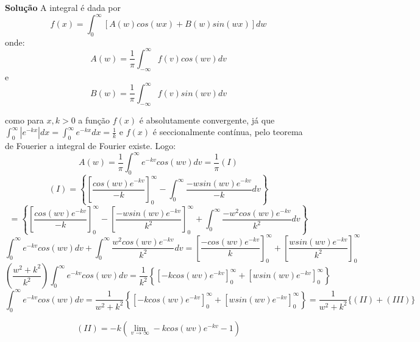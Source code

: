 \linespread{1.5}

\textbf{Solução}
A integral é dada por 
\begin{equation*}
    f(x) = \int_0^\infty [A(w)cos(wx) + B(w)sin(wx)]dw
\end{equation*}
onde:
\begin{equation*}
    A(w) = \frac{1}{\pi}\int_{-\infty}^\infty f(v) cos(wv)dv
\end{equation*}
e
\begin{equation*}
    B(w) = \frac{1}{\pi} \int_{-\infty}^\infty f(v) sin(wv)dv
\end{equation*}

como para $x, k> 0$ a função $f(x)$ é absolutamente convergente, já que $\int_0^\infty |e^{-kx}|dx = \int_0^\infty e^{-kx}dx = \frac{1}{k}$ e $f(x)$ é seccionalmente contínua, pelo teorema de Fouerier a integral de Fourier existe. Logo:
\begin{equation*}
    A(w) = \frac{1}{\pi}\int_0^\infty e^{-kv} cos(wv)dv = \frac{1}{\pi} (I)
\end{equation*}
\begin{equation*}
    (I) = \left\{\left[\frac{cos(wv)e^{-kv}}{-k}\right]^\infty_0 - \int_0^\infty \frac{-wsin(wv)e^{-kv}}{-k}dv\right\} 
\end{equation*}
\begin{equation*}
    = \left\{\left[\frac{cos(wv)e^{-kv}}{-k}\right]^\infty_0 - \left[\frac{-wsin(wv)e^{-kv}}{k^2}\right]^\infty_0 + \int_0^\infty \frac{-w^2cos(wv)e^{-kv}}{k^2}dv \right\}
\end{equation*}
\begin{equation*}
     \int_0^\infty e^{-kv} cos(wv)dv  + \int_0^\infty \frac{w^2cos(wv)e^{-kv}}{k^2}dv = \left[\frac{-cos(wv)e^{-kv}}{k}\right]^\infty_0 + \left[\frac{wsin(wv)e^{-kv}}{k^2}\right]^\infty_0
\end{equation*}
\begin{equation*}
    \left(\frac{w^2 + k^2}{k^2}\right)\int_0^\infty e^{-kv} cos(wv)dv = \frac{1}{k^2}\left\{\left[-kcos(wv)e^{-kv}\right]^\infty_0 + \left[wsin(wv)e^{-kv}\right]^\infty_0\right\}
\end{equation*}
\begin{equation*}
    \int_0^\infty e^{-kv} cos(wv)dv = \frac{1}{w^2 + k^2}\left\{\left[-kcos(wv)e^{-kv}\right]^\infty_0 + \left[wsin(wv)e^{-kv}\right]^\infty_0\right\} = \frac{1}{w^2 + k^2}\{(II) + (III)\}
\end{equation*}

\begin{equation*}
    (II) = -k (\lim_{v\rightarrow \infty}-kcos(wv)e^{-kv} - 1)
\end{equation*}


